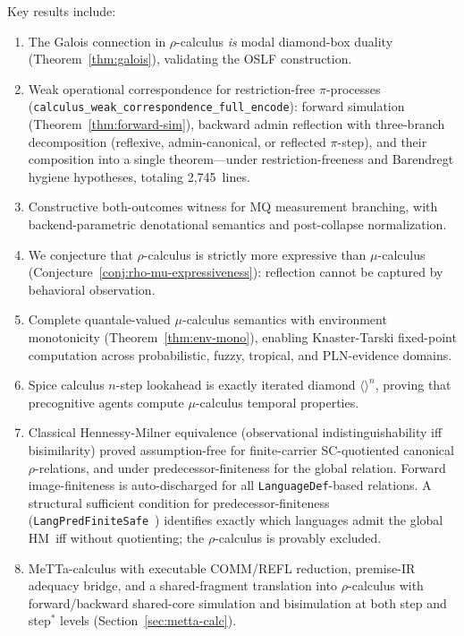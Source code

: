 \documentclass[11pt]{article}
\theoremstyle{definition}
\theoremstyle{remark}
\begin{document}
Key results include:
\begin{enumerate}[leftmargin=1.5em]
  \item The Galois connection in $\rho$-calculus \emph{is} modal
    diamond-box duality (Theorem~\ref{thm:galois}), validating the OSLF
    construction.
  \item Weak operational correspondence for restriction-free
    $\pi$-processes (\texttt{calculus\_weak\_correspondence\_full\_encode}):
    forward simulation (Theorem~\ref{thm:forward-sim}), backward admin
    reflection with three-branch decomposition (reflexive,
    admin-canonical, or reflected $\pi$-step), and their composition
    into a single theorem---under restriction-freeness and Barendregt
    hygiene hypotheses, totaling 2{,}745~lines.
  \item Constructive both-outcomes witness for MQ measurement branching,
    with backend-parametric denotational semantics and post-collapse
    normalization.
  \item We conjecture that $\rho$-calculus is strictly more expressive
    than $\mu$-calculus (Conjecture~\ref{conj:rho-mu-expressiveness}):
    reflection cannot be captured by behavioral observation.
  \item Complete quantale-valued $\mu$-calculus semantics with
    environment monotonicity (Theorem~\ref{thm:env-mono}), enabling
    Knaster-Tarski fixed-point computation across probabilistic, fuzzy,
    tropical, and PLN-evidence domains.
  \item Spice calculus $n$-step lookahead is exactly iterated diamond
    $\langle\rangle^n$, proving that precognitive agents compute
    $\mu$-calculus temporal properties.
  \item Classical Hennessy-Milner equivalence (observational
    indistinguishability iff bisimilarity) proved assumption-free for
    finite-carrier SC-quotiented canonical $\rho$-relations, and under
    predecessor-finiteness for the global relation.  Forward
    image-finiteness is auto-discharged for all
    \texttt{LanguageDef}-based relations.  A structural sufficient condition
    for predecessor-finiteness (\texttt{LangPredFiniteSafe}~\cite{leanOSLF2025})
    identifies exactly which languages admit the global HM~iff without
    quotienting; the $\rho$-calculus is provably excluded.
  \item MeTTa-calculus with executable COMM/REFL reduction, premise-IR
    adequacy bridge, and a shared-fragment translation into
    $\rho$-calculus with forward/backward shared-core simulation and
    bisimulation at both step and step$^*$ levels
    (Section~\ref{sec:metta-calc}).
\end{enumerate}
\end{document}
